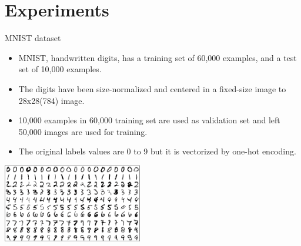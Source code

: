 \section{Experiments}
    \begin{frame}{MNIST dataset}
      \begin{itemize}
      \item {MNIST, handwritten digits, has a training set of 60,000 examples, and a test set of 10,000 examples.}
      \item {The digits have been size-normalized and centered in a fixed-size image to 28x28(784) image. }
      \item {10,000 examples in 60,000 training set are used as validation set and left 50,000 images are used for training.}
      \item {The original labels values are 0 to 9 but it is vectorized by one-hot encoding.}
      \end{itemize}
      \begin{center}
    \includegraphics[width=2.4in]{mnist.png}
      \end{center}
    \end{frame}
    
